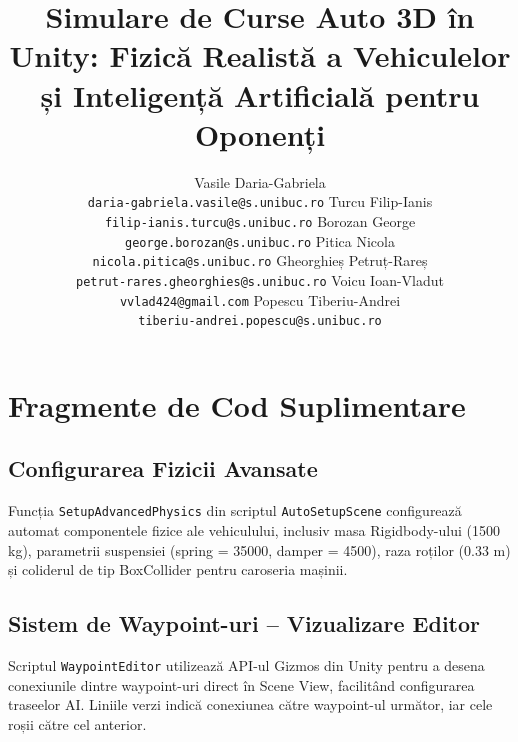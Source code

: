 \documentclass[11pt]{article}
\title{Simulare de Curse Auto 3D în Unity: Fizică Realistă a Vehiculelor și Inteligență Artificială pentru Oponenți}
\author{
Vasile Daria-Gabriela \\
\texttt{\scriptsize daria-gabriela.vasile@s.unibuc.ro}
\And
Turcu Filip-Ianis \\
\texttt{\scriptsize filip-ianis.turcu@s.unibuc.ro}
\And
Borozan George \\
\texttt{\scriptsize george.borozan@s.unibuc.ro}
\AND
Pitica Nicola \\
\texttt{\scriptsize nicola.pitica@s.unibuc.ro}
\And
Gheorghieș Petruț-Rareș \\
\texttt{\scriptsize petrut-rares.gheorghies@s.unibuc.ro}
\And
Voicu Ioan-Vladut \\
\texttt{\scriptsize vvlad424@gmail.com}
\AND
Popescu Tiberiu-Andrei \\
\texttt{\scriptsize tiberiu-andrei.popescu@s.unibuc.ro}
}
\begin{document}
\maketitle














\appendix

\section{Fragmente de Cod Suplimentare}
\label{sec:appendix}

\subsection{Configurarea Fizicii Avansate}
Funcția \texttt{SetupAdvancedPhysics} din scriptul \texttt{AutoSetupScene} configurează automat componentele fizice ale vehiculului, inclusiv masa Rigidbody-ului (1500 kg), parametrii suspensiei (spring = 35000, damper = 4500), raza roților (0.33 m) și coliderul de tip BoxCollider pentru caroseria mașinii.

\subsection{Sistem de Waypoint-uri -- Vizualizare Editor}
Scriptul \texttt{WaypointEditor} utilizează API-ul Gizmos din Unity pentru a desena conexiunile dintre waypoint-uri direct în Scene View, facilitând configurarea traseelor AI. Liniile verzi indică conexiunea către waypoint-ul următor, iar cele roșii către cel anterior.
\end{document}
